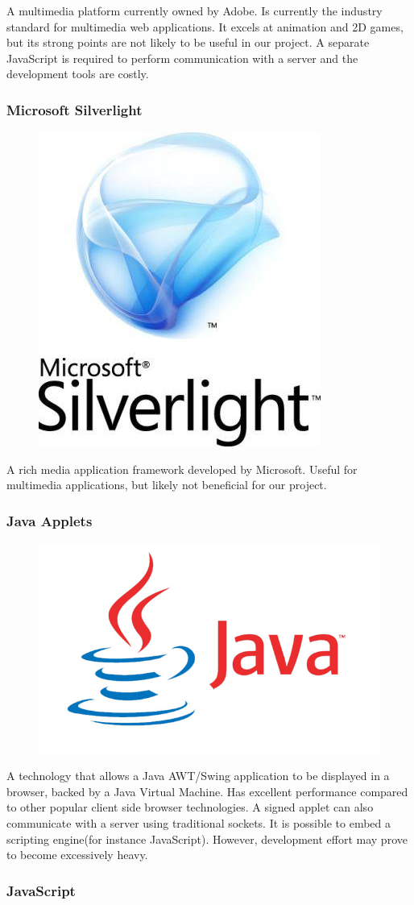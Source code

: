 A multimedia platform currently owned by Adobe. Is currently the industry standard for multimedia web applications. It excels at animation and 2D games, but its strong points are not likely to be useful in our project. A separate JavaScript is required to perform communication with a server and the development tools are costly.

\subsubsection{Microsoft Silverlight}

\begin{figure}
\vspace{-47pt}
\centering
\includegraphics[width=.10\textwidth]{image/silverlight-logo.jpg}
\end{figure}

A rich media application framework developed by Microsoft. Useful for multimedia applications, but likely not beneficial for our project.

\subsubsection{Java Applets}

\begin{figure}
\vspace{-30pt}
\centering
\includegraphics[width=.14\textwidth]{image/java-logo.jpg}
\end{figure}

A technology that allows a Java AWT/Swing application to be displayed in a browser, backed by a Java Virtual Machine. Has excellent performance compared to other popular client side browser technologies. A signed applet can also communicate with a server using traditional sockets. It is possible to embed a scripting engine(for instance JavaScript). However, development effort may prove to become excessively heavy.

\subsubsection{JavaScript}

